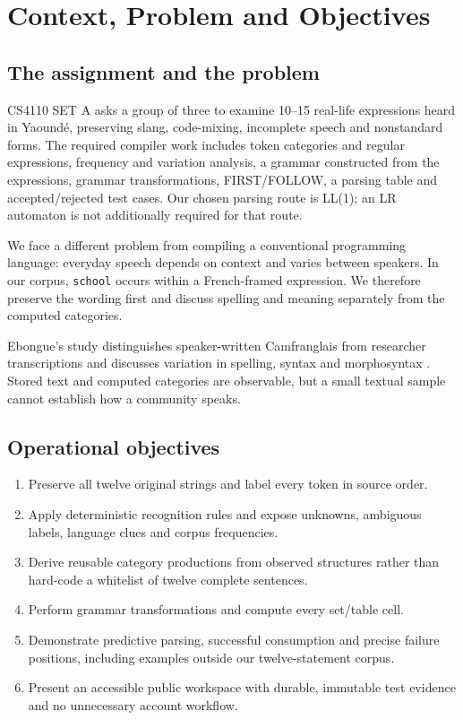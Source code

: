 \documentclass[11pt]{article}
\newcommand{\code}[1]{\texttt{#1}}
\begin{document}

\clearpage
{\setlength{\parskip}{0pt}\tableofcontents}

\clearpage
\section{Context, Problem and Objectives}
\subsection*{The assignment and the problem}
CS4110 SET A asks a group of three to examine 10--15 real-life expressions
heard in Yaound\'e, preserving slang, code-mixing, incomplete speech and
nonstandard forms. The required compiler work includes token categories and
regular expressions, frequency and variation analysis, a grammar constructed
from the expressions, grammar transformations, FIRST/FOLLOW, a parsing table
and accepted/rejected test cases. Our chosen parsing route is LL(1);
an LR automaton is not additionally required for that route.

We face a different problem from compiling a conventional programming
language: everyday speech depends on context and varies between speakers.
In our corpus, \code{school} occurs within a French-framed expression.
We therefore preserve the wording first and discuss spelling and meaning
separately from the computed categories.

Ebongue's study distinguishes speaker-written Camfranglais from researcher
transcriptions and discusses variation in spelling, syntax and morphosyntax
\cite{ebongue}. Stored text and computed categories are observable, but a
small textual sample cannot establish how a community speaks.

\subsection*{Operational objectives}
\begin{enumerate}
\item Preserve all twelve original strings and label every token in source order.
\item Apply deterministic recognition rules and expose unknowns, ambiguous
labels, language clues and corpus frequencies.
\item Derive reusable category productions from observed structures rather
than hard-code a whitelist of twelve complete sentences.
\item Perform grammar transformations and compute every set/table cell.
\item Demonstrate predictive parsing, successful consumption and precise
failure positions, including examples outside our twelve-statement corpus.
\item Present an accessible public workspace with durable, immutable test
evidence and no unnecessary account workflow.
\end{enumerate}
\end{document}
